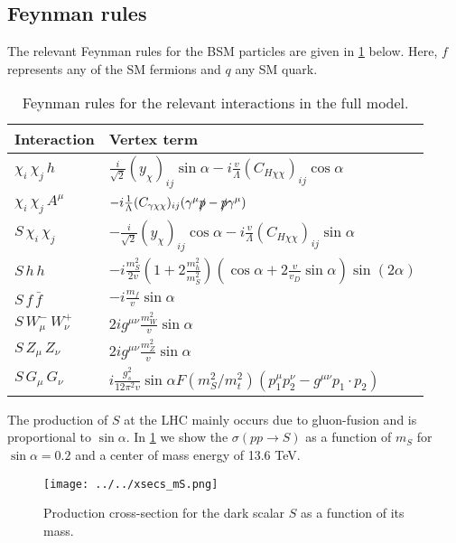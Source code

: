 \documentclass[a4paper,11pt]{article}
\begin{document}
\subsection*{Feynman rules}

The relevant Feynman rules for the BSM particles are given in \cref{tab:feynmanRules} below. Here, $f$ represents any of the SM fermions and $q$ any SM quark.

\begin{table}[h!]   \centering
    \vspace{0.2cm}
    \begin{tabular}{p{2cm}|p{8.5cm}}
      \toprule
      \textbf{Interaction} & \textbf{Vertex term}\\ \toprule 
      $\chi_i\,\chi_j\,h$  & $ \frac{i}{\sqrt{2}} (y_{\chi})_{ij} \sin\alpha -i \frac{v}{\Lambda} (C_{H\chi\chi})_{ij} \cos\alpha $\\
      $\chi_i\,\chi_j\, A^\mu$  & $-i \frac{1}{\Lambda} (C_{\gamma\chi\chi})_{ij} (\gamma^\mu \slashed{p} - \slashed{p} \gamma^\mu)$\\
      $S\,\chi_i\,\chi_j$  & $ -\frac{i}{\sqrt{2}} (y_{\chi})_{ij} \cos\alpha -i \frac{v}{\Lambda} (C_{H\chi\chi})_{ij} \sin\alpha $\\      
      $S\,h\,h$  & $- i \frac{m_{S}^{2}}{2 v}  \left( 1 + 2 \frac{m_{h}^{2}}{m_{S}^{2}}\right)  \left( \cos\alpha + 2 \frac{v}{v_D} \sin\alpha \right)  \sin (2\alpha)$\\
      $S\,f\,\bar{f}$  & $-i \frac{m_f}{v} \sin\alpha$ \\      
      $S\,W_\mu^-\,W_\nu^+$  & $2 i g^{\mu\nu} \frac{m_{W}^2}{v} \sin\alpha$\\
      $S\,Z_\mu\,Z_\nu$  & $2 i g^{\mu\nu} \frac{m_{Z}^2}{v} \sin\alpha$\\
      $S\,G_\mu\,G_\nu$  & $i \frac{g_s^2}{12 \pi^2 v} \sin\alpha F(m^2_S/m^2_t) (p_1^\mu p_2^\nu - g^{\mu\nu} p_1\cdot p_2) $\\
      \bottomrule        
    \end{tabular}
    \caption{Feynman rules for the relevant interactions in the full model. \label{tab:feynmanRules}}
\end{table}

The production of $S$ at the LHC mainly occurs due to gluon-fusion and is proportional to $\sin\alpha$. 
In \cref{fig:xsec_s} we show the $\sigma(p p \to S)$ as a function of $m_S$ for $\sin\alpha = 0.2$ and a center of mass energy of 13.6 TeV.

\begin{figure}
	\centering
	\texttt{[image: ../../xsecs\_mS.png]}
	\caption{Production cross-section for the dark scalar $S$ as a function of its mass.} \label{fig:xsec_s}
\end{figure}
\end{document}
